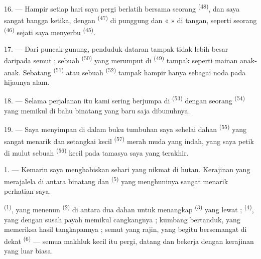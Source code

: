\VUsaut{3.0mm}

16. --- Hampir setiap hari saya pergi berlatih 
bersama seorang  \textsuperscript{(48)}, dan saya sangat
bangga ketika, dengan  \textsuperscript{(47)} di
punggung dan «  » di tangan, seperti seorang
 \textsuperscript{(46)} sejati saya menyerbu
 \textsuperscript{(45)}.

17. --- Dari puncak gunung, penduduk dataran tampak tidak lebih besar
daripada semut ; sebuah  \textsuperscript{(50)}
yang merumput di  \textsuperscript{(49)} tampak
seperti mainan anak-anak. Sebatang 
\textsuperscript{(51)} atau sebuah 
\textsuperscript{(52)} tampak hampir hanya sebagai noda pada hijaunya
alam.

18. --- Selama perjalanan itu kami sering berjumpa di  \textsuperscript{(53)} dengan seorang 
\textsuperscript{(54)} yang memikul di bahu binatang yang baru saja
dibunuhnya.

19. --- Saya menyimpan di dalam buku tumbuhan saya sehelai dahan
 \textsuperscript{(55)} yang sangat menarik dan
setangkai kecil  \textsuperscript{(57)} merah
muda yang indah, yang saya petik di mulut sebuah 
\textsuperscript{(56)} kecil pada tamasya saya yang terakhir.

\VUsaut{3.0mm}
\VUsaut{3.0mm}

\VUsaut{3.0mm}

1. --- Kemarin saya menghabiskan sehari yang nikmat di hutan.
Kerajinan yang merajalela di antara binatang dan 
\textsuperscript{(5)} yang menghuninya sangat menarik perhatian saya.

 \textsuperscript{(1)}, yang menenun 
\textsuperscript{(2)} di antara dua dahan untuk menangkap
 \textsuperscript{(3)} yang lewat ; 
\textsuperscript{(4)}, yang dengan susah payah memikul cangkangnya ;
kumbang bertanduk, yang memeriksa hasil tangkapannya ; semut yang
rajin, yang begitu bersemangat di dekat 
\textsuperscript{(6)} — semua makhluk kecil itu pergi, datang dan
bekerja dengan kerajinan yang luar biasa.

